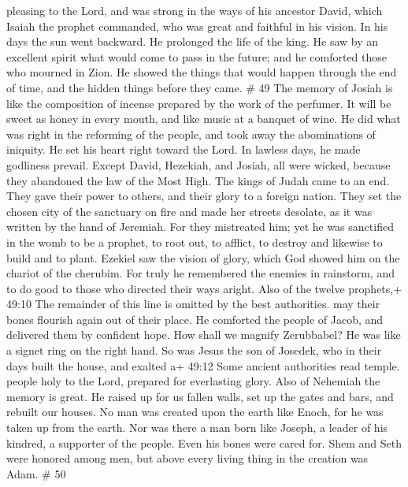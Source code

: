 pleasing to the Lord, and was strong in the ways of his ancestor David,
which Isaiah the prophet commanded, who was great and faithful in his
vision.  In his days the sun went backward. He prolonged
the life of the king.  He saw by an excellent spirit what
would come to pass in the future; and he comforted those who mourned in
Zion.  He showed the things that would happen through the
end of time, and the hidden things before they came. \# 49 
The memory of Josiah is like the composition of incense prepared by the
work of the perfumer. It will be sweet as honey in every mouth, and like
music at a banquet of wine.  He did what was right in the
reforming of the people, and took away the abominations of iniquity.
 He set his heart right toward the Lord. In lawless days, he
made godliness prevail.  Except David, Hezekiah, and Josiah,
all were wicked, because they abandoned the law of the Most High. The
kings of Judah came to an end.  They gave their power to
others, and their glory to a foreign nation.  They set the
chosen city of the sanctuary on fire and made her streets desolate, as
it was written by the hand of Jeremiah.  For they mistreated
him; yet he was sanctified in the womb to be a prophet, to root out, to
afflict, to destroy and likewise to build and to plant. 
Ezekiel saw the vision of glory, which God showed him on the chariot of
the cherubim.  For truly he remembered the enemies in
rainstorm, and to do good to those who directed their ways aright.
 Also of the twelve prophets,+ 49:10 The remainder of this
line is omitted by the best authorities. may their bones flourish again
out of their place. He comforted the people of Jacob, and delivered them
by confident hope.  How shall we magnify Zerubbabel? He was
like a signet ring on the right hand.  So was Jesus the son
of Josedek, who in their days built the house, and exalted a+ 49:12 Some
ancient authorities read temple. people holy to the Lord, prepared for
everlasting glory.  Also of Nehemiah the memory is great.
He raised up for us fallen walls, set up the gates and bars, and rebuilt
our houses.  No man was created upon the earth like Enoch,
for he was taken up from the earth.  Nor was there a man
born like Joseph, a leader of his kindred, a supporter of the people.
Even his bones were cared for.  Shem and Seth were honored
among men, but above every living thing in the creation was Adam. \# 50

